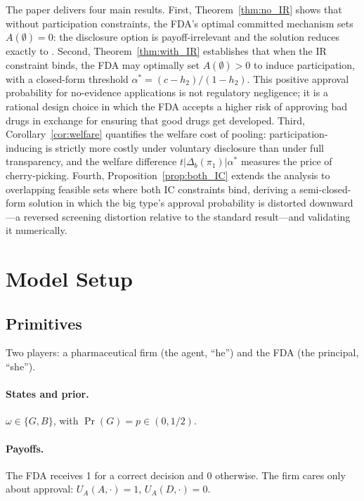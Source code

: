 \documentclass[12pt,a4paper]{article}
\begin{document}
The paper delivers four main results. First,
Theorem~\ref{thm:no_IR} shows that without participation
constraints, the FDA's optimal committed mechanism sets
$A(\emptyset) = 0$: the disclosure option is
payoff-irrelevant and the solution reduces exactly to
\citet{min2023}. Second, Theorem~\ref{thm:with_IR}
establishes that when the IR constraint binds, the FDA may
optimally set $A(\emptyset) > 0$ to induce participation,
with a closed-form threshold
$\alpha^* = (c - h_2)/(1 - h_2)$. This positive approval
probability for no-evidence applications is not regulatory
negligence; it is a rational design choice in which the FDA
accepts a higher risk of approving bad drugs in exchange for
ensuring that good drugs get developed.  Third,
Corollary~\ref{cor:welfare} quantifies the welfare cost of
pooling: participation-inducing is strictly more costly under
voluntary disclosure than under full transparency, and the
welfare difference $t|\Delta_b(\pi_1)|\alpha^*$ measures the
price of cherry-picking. Fourth,
Proposition~\ref{prop:both_IC} extends the analysis to
overlapping feasible sets where both IC constraints bind,
deriving a semi-closed-form solution in which the big type's
approval probability is distorted downward---a reversed
screening distortion relative to the standard
\citet{maskinriley1984} result---and validating it
numerically.


\section{Model Setup}
\label{sec:model}

\subsection{Primitives}

Two players: a pharmaceutical firm (the agent, ``he'') and
the FDA (the principal, ``she'').

\paragraph{States and prior.}
$\omega \in \{G, B\}$, with
$\Pr(G) = p \in (0, 1/2)$.

\paragraph{Payoffs.}
The FDA receives 1 for a correct decision and 0 otherwise.
The firm cares only about approval:
$U_A(A, \cdot) = 1$, $U_A(D, \cdot) = 0$.
\end{document}
